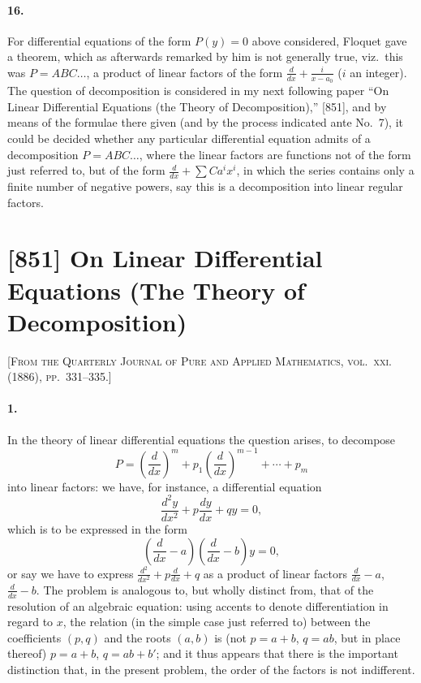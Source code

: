 \documentclass[11pt,a4paper]{book}
\begin{document}
\paragraph{16.} For differential equations of the form $P(y) = 0$ above considered, Floquet gave a theorem, which as afterwards remarked by him is not generally true, viz.\ this was $P = ABC\ldots$, a product of linear factors of the form $\frac{d}{dx} + \frac{i}{x-a_{0}}$ ($i$ an integer). The question of decomposition is considered in my next following paper ``On Linear Differential Equations (the Theory of Decomposition),'' [851], and by means of the formulae there given (and by the process indicated ante No.~7), it could be decided whether any particular differential equation admits of a decomposition $P = ABC\ldots$, where the linear factors are functions not of the form just referred to, but of the form $\frac{d}{dx} + \sum Ca^{i}x^{i}$, in which the series contains only a finite number of negative powers, say this is a decomposition into linear regular factors.

\newpage
\section*{[851] On Linear Differential Equations (The Theory of Decomposition)}

\noindent\textsc{[From the Quarterly Journal of Pure and Applied Mathematics, vol.~xxi. (1886), pp.~331--335.]}

\smallskip

\paragraph{1.} In the theory of linear differential equations the question arises, to decompose
\[
P = \left(\frac{d}{dx}\right)^{m} + p_{1}\left(\frac{d}{dx}\right)^{m-1} + \cdots + p_{m}
\]
into linear factors: we have, for instance, a differential equation
\[
\frac{d^{2}y}{dx^{2}} + p\frac{dy}{dx} + qy = 0,
\]
which is to be expressed in the form
\[
\left(\frac{d}{dx} - a\right)\left(\frac{d}{dx} - b\right)y = 0,
\]
or say we have to express $\frac{d^{2}}{dx^{2}} + p\frac{d}{dx} + q$ as a product of linear factors $\frac{d}{dx} - a$, $\frac{d}{dx} - b$. The problem is analogous to, but wholly distinct from, that of the resolution of an algebraic equation: using accents to denote differentiation in regard to $x$, the relation (in the simple case just referred to) between the coefficients $(p,q)$ and the roots $(a,b)$ is (not $p = a+b$, $q = ab$, but in place thereof) $p = a+b$, $q = ab + b'$; and it thus appears that there is the important distinction that, in the present problem, the order of the factors is not indifferent.
\end{document}
